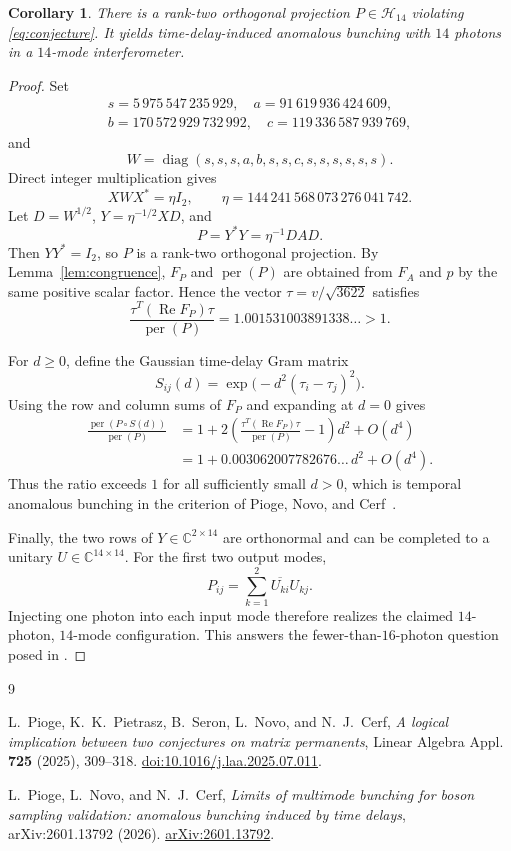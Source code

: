 \documentclass[11pt]{amsart}
\newtheorem{corollary}[theorem]{Corollary}
\newcommand{\HH}{\mathcal H}
\newcommand{\permanent}{\operatorname{per}}
\newcommand{\Real}{\operatorname{Re}}
\begin{document}
\begin{corollary}\label{cor:projection}
There is a rank-two orthogonal projection $P\in\HH_{14}$ violating
\eqref{eq:conjecture}. It yields time-delay-induced anomalous bunching
with $14$ photons in a $14$-mode interferometer.
\end{corollary}

\begin{proof}
Set
\[
\begin{gathered}
 s=5\,975\,547\,235\,929,
 \quad a=91\,619\,936\,424\,609,\\
 b=170\,572\,929\,732\,992,
 \quad c=119\,336\,587\,939\,769,
\end{gathered}
\]
and
\[
  W=\operatorname{diag}(s,s,s,a,b,s,s,c,s,s,s,s,s,s).
\]
Direct integer multiplication gives
\[
  XWX^*=\eta I_2,
  \qquad
  \eta=144\,241\,568\,073\,276\,041\,742.
\]
Let $D=W^{1/2}$, $Y=\eta^{-1/2}XD$, and
\[
  P=Y^*Y=\eta^{-1}DAD.
\]
Then $YY^*=I_2$, so $P$ is a rank-two orthogonal projection. By
Lemma~\ref{lem:congruence}, $F_P$ and $\permanent(P)$ are obtained from
$F_A$ and $p$ by the same positive scalar factor. Hence the vector
$\tau=v/\sqrt{3622}$ satisfies
\[
  \frac{\tau^T(\Real F_P)\tau}{\permanent(P)}
  =1.001531003891338\ldots>1.
\]

For $d\geq0$, define the Gaussian time-delay Gram matrix
\[
  S_{ij}(d)=\exp\bigl(-d^2(\tau_i-\tau_j)^2\bigr).
\]
Using the row and column sums of $F_P$ and expanding at $d=0$ gives
\begin{align*}
  \frac{\permanent(P\circ S(d))}{\permanent(P)}
  &=1+2\left(
  \frac{\tau^T(\Real F_P)\tau}{\permanent(P)}-1
  \right)d^2+O(d^4)\\
  &=1+0.003062007782676\ldots\,d^2+O(d^4).
\end{align*}
Thus the ratio exceeds $1$ for all sufficiently small $d>0$, which is
temporal anomalous bunching in the criterion of Pioge, Novo, and
Cerf~\cite{PiogeNovoCerf}.

Finally, the two rows of $Y\in\mathbb C^{2\times14}$ are orthonormal
and can be completed to a unitary $U\in\mathbb C^{14\times14}$. For
the first two output modes,
\[
  P_{ij}=\sum_{k=1}^2\overline{U_{ki}}U_{kj}.
\]
Injecting one photon into each input mode therefore realizes the
claimed $14$-photon, $14$-mode configuration. This answers the
fewer-than-$16$-photon question posed in \cite{PiogeNovoCerf}.
\end{proof}

\begin{thebibliography}{9}

L.~Pioge, K.~K.~Pietrasz, B.~Seron, L.~Novo, and N.~J.~Cerf,
\emph{A logical implication between two conjectures on matrix permanents},
Linear Algebra Appl. \textbf{725} (2025), 309--318.
\href{https://doi.org/10.1016/j.laa.2025.07.011}
{doi:10.1016/j.laa.2025.07.011}.

L.~Pioge, L.~Novo, and N.~J.~Cerf,
\emph{Limits of multimode bunching for boson sampling validation:
anomalous bunching induced by time delays},
arXiv:2601.13792 (2026).
\href{https://arxiv.org/abs/2601.13792}
{arXiv:2601.13792}.

\end{thebibliography}
\end{document}
